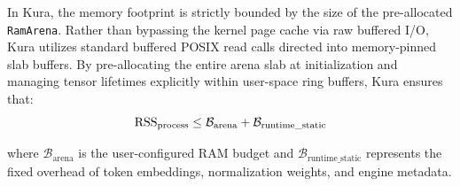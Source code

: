 In Kura, the memory footprint is strictly bounded by the size of the pre-allocated \texttt{RamArena}. Rather than bypassing the kernel page cache via raw buffered I/O, Kura utilizes standard buffered POSIX read calls directed into memory-pinned slab buffers. By pre-allocating the entire arena slab at initialization and managing tensor lifetimes explicitly within user-space ring buffers, Kura ensures that:
\begin{equation}\small
  \mathrm{RSS}_{\text{process}} \le \mathcal{B}_{\text{arena}} + \mathcal{B}_{\text{runtime\_static}}
\end{equation}
\par\vspace{2pt}
where $\mathcal{B}_{\text{arena}}$ is the user-configured RAM budget and $\mathcal{B}_{\text{runtime\_static}}$ represents the fixed overhead of token embeddings, normalization weights, and engine metadata.
